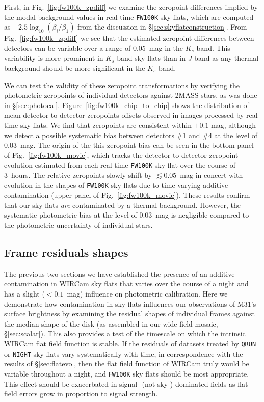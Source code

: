 \documentclass[iop]{emulateapj}
\newcommand{\Fig}[1]{Fig.~\ref{fig:#1}}  %
\newcommand{\Sec}[1]{\S\ref{sec:#1}}  %
\begin{document}
First, in \Fig{fw100k_zpdiff} we examine the zeropoint differences implied by the modal background values in real-time \texttt{FW100K} sky flats, which are computed as $-2.5 \log_{10}(\beta_i / \beta_1)$ from the discussion in \Sec{skyflatconstruction}.
From \Fig{fw100k_zpdiff} we see that the estimated zeropoint differences between detectors can be variable over a range of 0.05~mag in the $K_s$-band.
This variability is more prominent in $K_s$-band sky flats than in $J$-band as any thermal background should be more significant in the $K_s$ band.

We can test the validity of these zeropoint transformations by verifying the photometric zeropoints of individual detectors against 2MASS stars, as was done in \Sec{photocal}.
Figure~\ref{fig:fw100k_chip_to_chip} shows the distribution of mean detector-to-detector zeropoints offsets observed in images processed by real-time sky flats.
We find that zeropoints are consistent within $\pm 0.1$ mag, although we detect a possible systematic bias between detectors \#1 and \#4 at the level of $0.03$~mag.
The origin of the this zeropoint bias can be seen in the bottom panel of \Fig{fw100k_movie}, which tracks the detector-to-detector zeropoint evolution estimated from each real-time \texttt{FW100K} sky flat over the course of 3~hours.
The relative zeropoints slowly shift by $\lesssim 0.05$~mag in concert with evolution in the shapes of \texttt{FW100K} sky flats due to time-varying additive contamination (upper panel of \Fig{fw100k_movie}).
These results confirm that our sky flats \emph{are} contaminated by a thermal background.
However, the systematic photometric bias at the level of $0.03$~mag is negligible compared to the photometric uncertainty of individual stars.

\subsection{Frame residuals shapes}
\label{sec:frameblockresiduals}

The previous two sections we have established the presence of an additive contamination in WIRCam sky flats that varies over the course of a night and has a slight ($<0.1$~mag) influence on photometric calibration.
Here we demonstrate how contamination in sky flats influences our observations of M31's surface brightness by examining the residual shapes of individual frames against the median shape of the disk (as assembled in our wide-field mosaic, \Sec{scalar}).
This also provides a test of the timescale on which the intrinsic WIRCam flat field function is stable.
If the residuals of datasets treated by \texttt{QRUN} or \texttt{NIGHT} sky flats vary systematically with time, in correspondence with the results of \Sec{flatevo}, then the flat field function of WIRCam truly would be variable throughout a night, and \texttt{FW100K} sky flats should be most appropriate.
This effect should be exacerbated in signal- (not sky-) dominated fields as flat field errors grow in proportion to signal strength.
\end{document}
